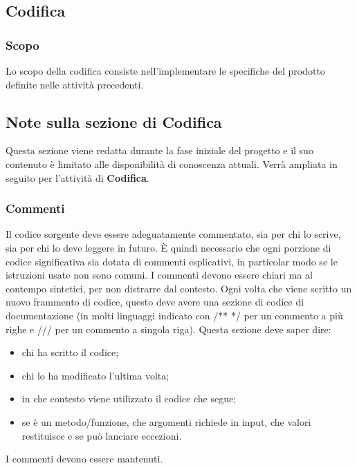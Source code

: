 \subsection{Codifica}
\subsubsection{Scopo}
Lo scopo della codifica consiste nell'implementare le specifiche del prodotto definite nelle attività precedenti.

\subsection*{Note sulla sezione di Codifica}
Questa sezione viene redatta durante la fase iniziale del progetto e il suo contenuto è limitato alle disponibilità di conoscenza attuali.
Verrà ampliata in seguito per l'attività di \textbf{Codifica}.

\subsubsection{Commenti}
Il codice sorgente deve essere adeguatamente commentato, sia per chi lo scrive, sia per chi lo deve leggere in futuro.
È quindi necessario che ogni porzione di codice significativa sia dotata di commenti esplicativi, in particolar modo se le istruzioni usate non sono comuni.
I commenti devono essere chiari ma al contempo sintetici, per non distrarre dal contesto.
Ogni volta che viene scritto un nuovo frammento di codice, questo deve avere una sezione di codice di documentazione (in molti linguaggi indicato con /** */ per un commento a più righe e /// per un commento a singola riga).
Questa sezione deve saper dire:
\begin{itemize}
    \item chi ha scritto il codice;
    \item chi lo ha modificato l'ultima volta;
    \item in che contesto viene utilizzato il codice che segue;
    \item se è un metodo/funzione, che argomenti richiede in input, che valori restituisce e se può lanciare eccezioni.
\end{itemize}
I commenti devono essere mantenuti.


